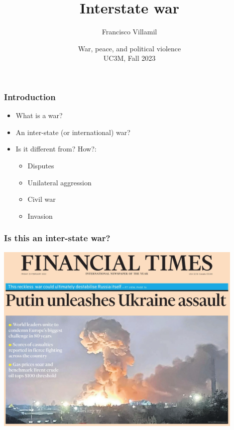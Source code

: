 \documentclass[aspectratio=43]{beamer}
\title{\huge Interstate war}
\author{Francisco Villamil}
\date{War, peace, and political violence\\UC3M, Fall 2023}
\begin{document}
\begin{frame}
  \titlepage
\end{frame}

\begin{frame}
\frametitle{Introduction}
\centering

\begin{itemize}[<+->]
  \item What is a war?
  \item An inter-state (or international) war?
  \item Is it different from? How?:
  \begin{itemize}
    \item Disputes
    \item Unilateral aggression
    \item Civil war
    \item Invasion
  \end{itemize}
\end{itemize}

\end{frame}


\begin{frame}
\frametitle{Is this an inter-state war?}
\centering

\includegraphics[width = 0.9\textwidth]{img/invasion_ft}

\end{frame}
\end{document}
